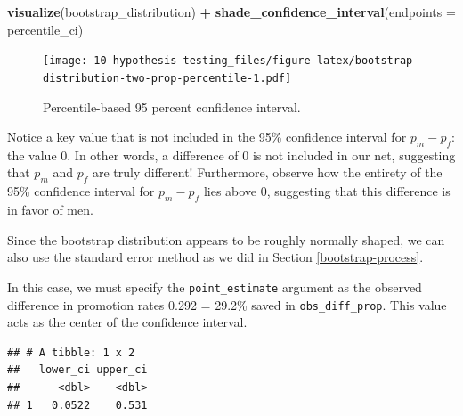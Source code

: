 \documentclass[
]{book}
\newenvironment{Shaded}{\begin{snugshade}}{\end{snugshade}}
\newcommand{\DataTypeTok}[1]{\textcolor[rgb]{0.13,0.29,0.53}{#1}}
\newcommand{\FloatTok}[1]{\textcolor[rgb]{0.00,0.00,0.81}{#1}}
\newcommand{\KeywordTok}[1]{\textcolor[rgb]{0.13,0.29,0.53}{\textbf{#1}}}
\newcommand{\NormalTok}[1]{#1}
\newcommand{\OperatorTok}[1]{\textcolor[rgb]{0.81,0.36,0.00}{\textbf{#1}}}
\newcommand{\StringTok}[1]{\textcolor[rgb]{0.31,0.60,0.02}{#1}}
\begin{document}
\begin{Shaded}
\begin{Highlighting}[]
\KeywordTok{visualize}\NormalTok{(bootstrap_distribution) }\OperatorTok{+}\StringTok{ }
\StringTok{  }\KeywordTok{shade_confidence_interval}\NormalTok{(}\DataTypeTok{endpoints =}\NormalTok{ percentile_ci)}
\end{Highlighting}
\end{Shaded}

\begin{figure}
\centering
\texttt{[image: 10-hypothesis-testing\_files/figure-latex/bootstrap-distribution-two-prop-percentile-1.pdf]}
\caption{\label{fig:bootstrap-distribution-two-prop-percentile}Percentile-based 95 percent confidence interval.}
\end{figure}

Notice a key value that is not included in the 95\% confidence interval for \(p_{m} - p_{f}\): the value 0. In other words, a difference of 0 is not included in our net, suggesting that \(p_{m}\) and \(p_{f}\) are truly different! Furthermore, observe how the entirety of the 95\% confidence interval for \(p_{m} - p_{f}\) lies above 0, suggesting that this difference is in favor of men.

Since the bootstrap distribution appears to be roughly normally shaped, we can also use the standard error method as we did in Section \ref{bootstrap-process}.

In this case, we must specify the \texttt{point\_estimate} argument as the observed difference in promotion rates 0.292 = 29.2\% saved in \texttt{obs\_diff\_prop}. This value acts as the center of the confidence interval.

\begin{Shaded}
\end{Shaded}

\begin{verbatim}
## # A tibble: 1 x 2
##   lower_ci upper_ci
##      <dbl>    <dbl>
## 1   0.0522    0.531
\end{verbatim}
\end{document}
